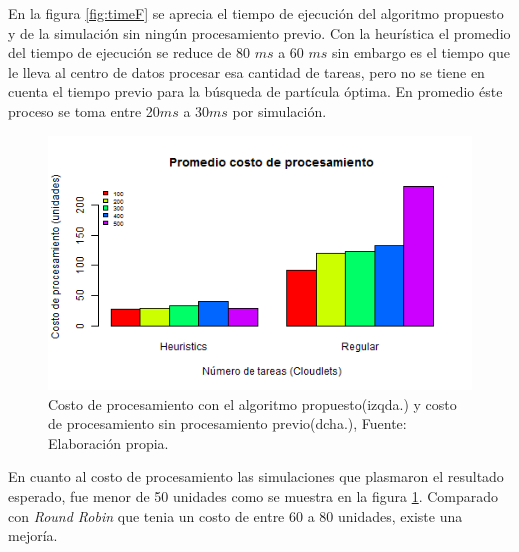 En la figura \ref{fig:timeF} se aprecia el tiempo de ejecución del algoritmo propuesto y de la simulación sin ningún procesamiento previo. Con la heurística el promedio del tiempo de ejecución se reduce de 80 $ms$ a 60 $ms$ sin embargo es el tiempo que le lleva al centro de datos procesar esa cantidad de tareas, pero no se tiene en cuenta el tiempo previo para la búsqueda de partícula óptima. En promedio éste proceso se toma entre 20$ms$ a 30$ms$ por simulación.

\renewcommand\thefigure{\arabic{figure}}
\begin{figure}[h!] 
	\centering
	\includegraphics[scale=0.7]{media/costoFinal}
	\caption{Costo de procesamiento con el algoritmo propuesto(izqda.) y costo de procesamiento sin procesamiento previo(dcha.), Fuente: Elaboraci\'on propia.}
	\label{fig:costF}
\end{figure}

En cuanto al costo de procesamiento las simulaciones que plasmaron el resultado esperado, fue menor de 50 unidades como se muestra en la figura \ref{fig:costF}. Comparado con \textit{Round Robin} que tenia un costo de entre 60 a 80 unidades, existe una mejoría.

